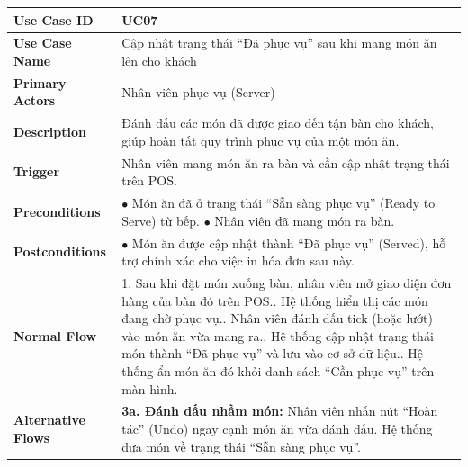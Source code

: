 \begin{longtable}{|p{3.5cm}|p{12.5cm}|}
\hline
\textbf{Use Case ID} & UC07 \\ \hline
\textbf{Use Case Name} & Cập nhật trạng thái ``Đã phục vụ'' sau khi mang món ăn lên cho khách \\ \hline
\textbf{Primary Actors} & Nhân viên phục vụ (Server) \\ \hline
\textbf{Description} & Đánh dấu các món đã được giao đến tận bàn cho khách, giúp hoàn tất quy trình phục vụ của một món ăn. \\ \hline
\textbf{Trigger} & Nhân viên mang món ăn ra bàn và cần cập nhật trạng thái trên POS. \\ \hline
\textbf{Preconditions} &
$\bullet$ Món ăn đã ở trạng thái ``Sẵn sàng phục vụ'' (Ready to Serve) từ bếp.\newline
$\bullet$ Nhân viên đã mang món ra bàn. \\ \hline
\textbf{Postconditions} & $\bullet$ Món ăn được cập nhật thành ``Đã phục vụ'' (Served), hỗ trợ chính xác cho việc in hóa đơn sau này. \\ \hline
\textbf{Normal Flow} &
1. Sau khi đặt món xuống bàn, nhân viên mở giao diện đơn hàng của bàn đó trên POS.\newline
2. Hệ thống hiển thị các món đang chờ phục vụ.\newline
3. Nhân viên đánh dấu tick (hoặc lướt) vào món ăn vừa mang ra.\newline
4. Hệ thống cập nhật trạng thái món thành ``Đã phục vụ'' và lưu vào cơ sở dữ liệu.\newline
5. Hệ thống ẩn món ăn đó khỏi danh sách ``Cần phục vụ'' trên màn hình. \\ \hline
\textbf{Alternative Flows} &
\textbf{3a. Đánh dấu nhầm món:} Nhân viên nhấn nút ``Hoàn tác'' (Undo) ngay cạnh món ăn vừa đánh dấu. Hệ thống đưa món về trạng thái ``Sẵn sàng phục vụ''. \\ \hline
\end{longtable}

